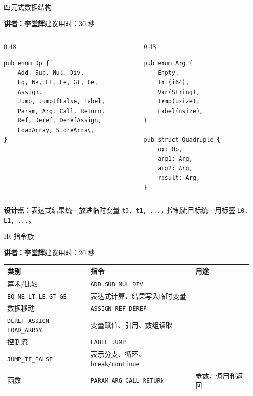\documentclass[aspectratio=169]{ctexbeamer}
\newcommand{\speaker}[2]{%
    \vspace{-0.4em}
    \begin{flushright}
        \scriptsize\color{mainblue}\textbf{讲者：#1}\quad 建议用时：#2
    \end{flushright}
    \vspace{-0.7em}
}
\begin{document}
\begin{frame}[fragile]{四元式数据结构}
    \speaker{李堂辉}{30 秒}
    \begin{columns}[T]
    \begin{column}{0.48\textwidth}
        \begin{lstlisting}[style=tinycode]
pub enum Op {
    Add, Sub, Mul, Div,
    Eq, Ne, Lt, Le, Gt, Ge,
    Assign,
    Jump, JumpIfFalse, Label,
    Param, Arg, Call, Return,
    Ref, Deref, DerefAssign,
    LoadArray, StoreArray,
}
        \end{lstlisting}
    \end{column}
    \begin{column}{0.48\textwidth}
        \begin{lstlisting}[style=tinycode]
pub enum Arg {
    Empty,
    Int(i64),
    Var(String),
    Temp(usize),
    Label(usize),
}

pub struct Quadruple {
    op: Op,
    arg1: Arg,
    arg2: Arg,
    result: Arg,
}
        \end{lstlisting}
    \end{column}
    \end{columns}
    \textbf{设计点：}表达式结果统一放进临时变量 \texttt{t0, t1, ...}，控制流目标统一用标签 \texttt{L0, L1, ...}。
\end{frame}

\begin{frame}{IR 指令族}
    \speaker{李堂辉}{20 秒}
    \begin{table}
    \centering
    \scriptsize
    \begin{tabular}{p{2.4cm}p{4.4cm}p{4.7cm}}
        \toprule
        \textbf{类别} & \textbf{指令} & \textbf{用途} \\
        \midrule
        算术/比较 & \texttt{ADD SUB MUL DIV}\\ \texttt{EQ NE LT LE GT GE} & 表达式计算，结果写入临时变量 \\
        数据移动 & \texttt{ASSIGN REF DEREF}\\ \texttt{DEREF\_ASSIGN LOAD\_ARRAY} & 变量赋值、引用、数组读取 \\
        控制流 & \texttt{LABEL JUMP}\\ \texttt{JUMP\_IF\_FALSE} & 表示分支、循环、\texttt{break/continue} \\
        函数 & \texttt{PARAM ARG CALL RETURN} & 参数、调用和返回 \\
        \bottomrule
    \end{tabular}
    \end{table}
\end{frame}
\end{document}
